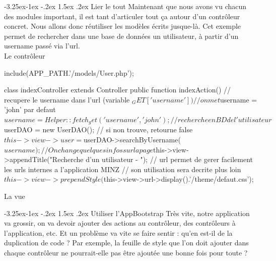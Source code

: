 \documentclass[a4paper,11pt]{article}
\makeatletter
\renewcommand{\subsection}{\@startsection{subsection}{2}{\z@}%
             {-3.25ex\@plus -1ex \@minus -.2ex}%
             {1.5ex \@plus .2ex}%
             {\color{bleuFonce}\normalfont\large\bfseries}}
\makeatother
\begin{document}
\subsection{Lier le tout}
Maintenant que nous avons vu chacun des modules important, il est tant d'articuler tout ça autour d'un contrôleur concret. Nous allons donc réutiliser les modèles écrits jusque-là. Cet exemple permet de rechercher dans une base de données un utilisateur, à partir d'un username passé via l'url.\\

Le contrôleur
\begin{PHP}
include(APP_PATH.'/models/User.php');

class indexController extends Controller {
  public function indexAction() {
    // recupere le username dans l'url (variable $_GET['username'])
    // on met $username = 'john' par defaut
    $username = Helper::fetch_get('username', 'john');
  
    // recherche en BD de l'utilisateur
    $userDAO = new UserDAO();
    // si non trouve, retourne false
    $this->view->user = $userDAO->searchByUsername($username);
    
    // On change quelques infos sur la page
    $this->view->appendTitle("Recherche d'un utilisateur - ");
    // url permet de gerer facilement les urls internes a l'application MINZ
    // son utilisation sera decrite plus loin
    $this->view->prependStyle($this->view->url->display().'/theme/defaut.css');
  }
}
\end{PHP}

La vue



\subsection{Utiliser l'AppBootstrap}
Très vite, notre application va grossir, on va devoir ajouter des actions au contrôleur, des contrôleurs à l'application, etc. Et un problème va vite se faire sentir : qu'en est-il de la duplication de code ? Par exemple, la feuille de style que l'on doit ajouter dans chaque contrôleur ne pourrait-elle pas être ajoutée une bonne fois pour toute ?
\end{document}

